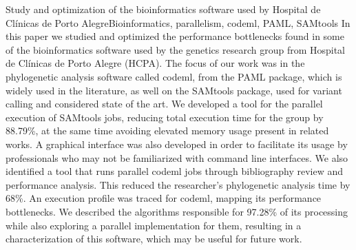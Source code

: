 \documentclass[cic,tc]{iiufrgs}
\begin{document}
\begin{englishabstract}{Study and optimization of the bioinformatics software used by Hospital de Clínicas de Porto Alegre}{Bioinformatics, parallelism, codeml, PAML, SAMtools} 
In this paper we studied and optimized the performance bottlenecks found in
some of the bioinformatics software used by the genetics research group from
Hospital de Clínicas de Porto Alegre (HCPA). The focus of our work was in the
phylogenetic analysis software called codeml, from the PAML package, which is
widely used in the literature, as well on the SAMtools package, used for
variant calling and considered state of the art. 
%
We developed a tool for the parallel execution of SAMtools jobs, reducing
total execution time for the group by 88.79\%, at the same time avoiding
elevated memory usage present in related works. A graphical interface was also
developed in order to facilitate its usage by professionals who may not be
familiarized with command line interfaces.
%
We also identified a tool that runs parallel codeml jobs through bibliography
review and performance analysis. This reduced the researcher's phylogenetic
analysis time by 68\%. An execution profile was traced for codeml, mapping its
performance bottlenecks. We described the algorithms responsible for 97.28\% of
its processing while also exploring a parallel implementation for them,
resulting in a characterization of this software, which may be useful for
future work.
\end{englishabstract}

\listoffigures

\listoftables
\end{document}
